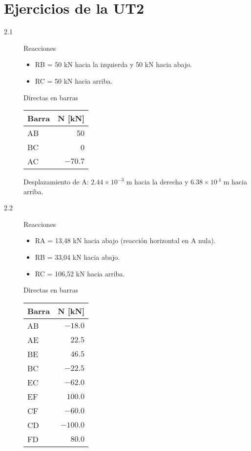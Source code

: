 \section{Ejercicios de la UT2}
%
\begin{description}
\item [2.1]
%
Reacciones
\begin{itemize}
\item RB = 50 kN hacia la izquierda y 50 kN hacia abajo.
\item RC = 50 kN hacia arriba.
\end{itemize}


Directas en barras
\begin{center}
\begin{tabular}{lr}
\hline
Barra & N [kN] \\
\hline
AB & 50 \\
BC & 0 \\
AC & $-70.7$\\
\hline
\end{tabular}
\end{center}

Desplazamiento de A: $2.44 \times  10^{-3}$ m hacia la derecha y $6.38 \times 10^{.4}$ m hacia arriba.

%
\item [2.2]

Reacciones
\begin{itemize}
\item RA = 13,48 kN hacia abajo (reacción horizontal en A nula).
\item RB = 33,04 kN hacia abajo.
\item  RC = 106,52 kN hacia arriba.
\end{itemize}

Directas en barras
\begin{center}
	\begin{tabular}{lr}
		\hline
Barra & N [kN] \\
\hline
AB & $-18.0$ \\
AE & $22.5$ \\
BE & $46.5$ \\
BC & $-22.5$ \\
EC & $-62.0$ \\
EF & $100.0$ \\
CF & $-60.0$ \\
CD & $-100.0$ \\
FD & $80.0$ \\
\hline
\end{tabular}
\end{center}


\end{description}
